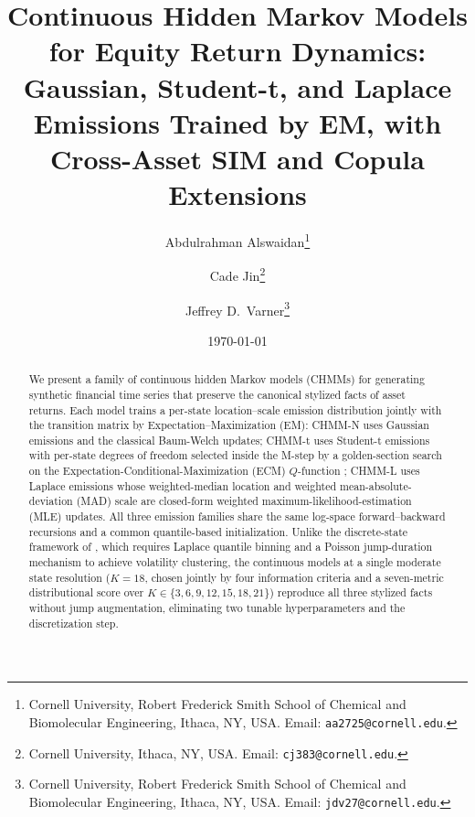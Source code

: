 \documentclass[11pt,a4paper]{article}
\title{Continuous Hidden Markov Models for Equity Return Dynamics:\\Gaussian, Student-t, and Laplace Emissions Trained by EM, with Cross-Asset SIM and Copula Extensions}
\author{
    Abdulrahman Alswaidan\thanks{Cornell University, Robert Frederick Smith School of Chemical and Biomolecular Engineering, Ithaca, NY, USA. Email: \texttt{aa2725@cornell.edu}.}
    \and
    Cade Jin\thanks{Cornell University, Ithaca, NY, USA. Email: \texttt{cj383@cornell.edu}.}
    \and
    Jeffrey D.\ Varner\thanks{Cornell University, Robert Frederick Smith School of Chemical and Biomolecular Engineering, Ithaca, NY, USA. Email: \texttt{jdv27@cornell.edu}.}
}
\date{\today}
\begin{document}
\maketitle

\begin{abstract}
We present a family of continuous hidden Markov models (CHMMs) for generating synthetic financial time series that preserve the canonical stylized facts of asset returns.
Each model trains a per-state location--scale emission distribution jointly with the transition matrix by Expectation--Maximization (EM): CHMM-N uses Gaussian emissions and the classical Baum-Welch updates; CHMM-t uses Student-t emissions with per-state degrees of freedom selected inside the M-step by a golden-section search on the Expectation-Conditional-Maximization (ECM) $Q$-function \citep{peel2000robust, liu1995ml}; CHMM-L uses Laplace emissions whose weighted-median location and weighted mean-absolute-deviation (MAD) scale are closed-form weighted maximum-likelihood-estimation (MLE) updates.
All three emission families share the same log-space forward--backward recursions and a common quantile-based initialization.
Unlike the discrete-state framework of \citet{alswaidan2026hybrid}, which requires Laplace quantile binning and a Poisson jump-duration mechanism to achieve volatility clustering, the continuous models at a single moderate state resolution ($K = 18$, chosen jointly by four information criteria \citep{nguyen2018hidden} and a seven-metric distributional score over $K \in \{3, 6, 9, 12, 15, 18, 21\}$) reproduce all three stylized facts without jump augmentation, eliminating two tunable hyperparameters and the discretization step.


\end{abstract}
\end{document}
